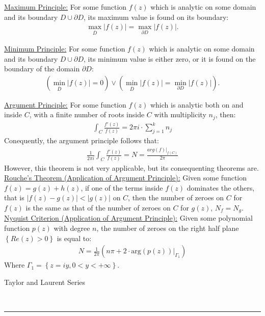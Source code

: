 \documentclass{article}
\newcommand{\header}[1]{\begin{large}\noindent #1\end{large}\\\rule{\textwidth}{0.5pt}}
\newcommand{\gap}{\medskip\\}
\newcommand{\sheader}[1]{\underline{#1:}}
\newcommand{\curly}[1]{\left\{#1\right\}}
\begin{document}
    \sheader{Maximum Principle} For some function $f(z)$ which is analytic on some domain 
    and its boundary $D \cup \partial D$, its maximum value is found on its boundary:
    \begin{align*}
        \max_{\overline{D}} |f(z)| = \max_{\partial D} |f(z)|.
    \end{align*}

    \sheader{Minimum Principle} For some function $f(z)$ which is analytic on some domain
    and its boundary $D \cup \partial D$, its minimum value is either zero, or it is 
    found on the boundary of the domain $\partial D$:
    \begin{align*}
        \left(\min_{\overline{D}} |f(z)| = 0 \right) \vee \left(\min_{\overline{D}}|f(z)| = \min_{\partial D} |f(z)|\right).
    \end{align*}
    
    \sheader{Argument Principle}
    For some function $f(z)$ which is analytic both on and inside $C$, with 
    a finite number of roots inside $C$ with multiplicity $n_j$, then:
    \begin{align*}
        \int_C \frac{f'(z)}{f(z)} = 2\pi i \cdot \sum_{j = 1}^k n_j
    \end{align*}
    Conequently, the argument principle follows that:
    \begin{align*}
        \frac{1}{2\pi i} \int_C \frac{f'(z)}{f(z)} = N = \frac{arg(f)|_{f(C)}}{2\pi}
    \end{align*}
    However, this theorem is not very applicable, but its consequenting theorems are.
    \gap
    \sheader{Rouche's Theorem (Application of Argument Principle)} 
    Given some function $f(z) = g(z) + h(z)$, if one of the terms inside $f(z)$
    dominates the others, that is $|f(z)-g(z)| < |g(z)|$ on $C$, then 
    the number of zeroes on $C$ for $f(z)$ is the same as that of the number of 
    zeroes on $C$ for $g(z)$, $N_f = N_g$.
    \gap
    \sheader{Nyquist Criterion (Application of Argument Principle)} 
    Given some polynomial function $p(z)$ with degree $n$, the number of zeroes on the right half plane $\curly{Re(z) > 0}$
    is equal to:
    \begin{align*}
        N = \frac{1}{2\pi}\left(n\pi + 2\cdot \text{arg}(p(z))|_{\Gamma_1}\right)
    \end{align*}
    Where $\Gamma_1 = \curly{z = iy, 0 < y < +\infty}$.
    \gap
    \header{Taylor and Laurent Series}
\end{document}
